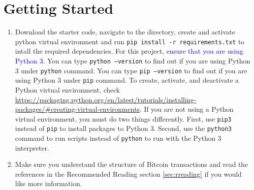 \documentclass[11pt]{article}
\begin{document}
\section{Getting Started}
\begin{enumerate}
\item Download the starter code, navigate to the directory, create and activate python virtual environment and run \texttt{pip install -r requirements.txt} to intall the required dependencies. For this project, \textcolor{blue}{ensure that you are using Python 3.} You can type \texttt{python --version} to find out if you are using Python 3 under \texttt{python} command. You can type \texttt{pip --version} to find out if you are using Python 3 under \texttt{pip} command. To create, activate, and deactivate a Python virtual environment, check \href{https://packaging.python.org/en/latest/tutorials/installing-packages/#creating-virtual-environments}{https://packaging.python.org/en/latest/tutorials/installing-packages/\#creating-virtual-environments}. If you are not using a Python virtual environment, you must do two things differently. First, use \texttt{pip3} instead of \texttt{pip} to install packages to Python 3. Second, use the \texttt{python3} command to run scripts instead of \texttt{python} to run with the Python 3 interpreter.




\item Make sure you understand the structure of Bitcoin transactions and read the references in the Recommended Reading section \ref{sec:rreading} if you would like more information.


\end{enumerate}
\end{document}
